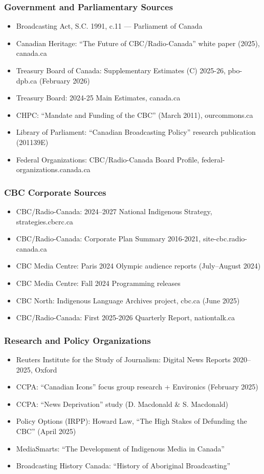 \documentclass[11pt,letterpaper]{article}
\begin{document}
\subsubsection{Government and Parliamentary Sources}
\begin{itemize}[noitemsep]
\item Broadcasting Act, S.C. 1991, c.11 --- Parliament of Canada
\item Canadian Heritage: ``The Future of CBC/Radio-Canada'' white paper (2025), canada.ca
\item Treasury Board of Canada: Supplementary Estimates (C) 2025-26, pbo-dpb.ca (February 2026)
\item Treasury Board: 2024-25 Main Estimates, canada.ca
\item CHPC: ``Mandate and Funding of the CBC'' (March 2011), ourcommons.ca
\item Library of Parliament: ``Canadian Broadcasting Policy'' research publication (201139E)
\item Federal Organizations: CBC/Radio-Canada Board Profile, federal-organizations.canada.ca
\end{itemize}

\subsubsection{CBC Corporate Sources}
\begin{itemize}[noitemsep]
\item CBC/Radio-Canada: 2024--2027 National Indigenous Strategy, strategies.cbcrc.ca
\item CBC/Radio-Canada: Corporate Plan Summary 2016-2021, site-cbc.radio-canada.ca
\item CBC Media Centre: Paris 2024 Olympic audience reports (July--August 2024)
\item CBC Media Centre: Fall 2024 Programming releases
\item CBC North: Indigenous Language Archives project, cbc.ca (June 2025)
\item CBC/Radio-Canada: First 2025-2026 Quarterly Report, nationtalk.ca
\end{itemize}

\subsubsection{Research and Policy Organizations}
\begin{itemize}[noitemsep]
\item Reuters Institute for the Study of Journalism: Digital News Reports 2020--2025, Oxford
\item CCPA: ``Canadian Icons'' focus group research + Environics (February 2025)
\item CCPA: ``News Deprivation'' study (D. Macdonald \& S. Macdonald)
\item Policy Options (IRPP): Howard Law, ``The High Stakes of Defunding the CBC'' (April 2025)
\item MediaSmarts: ``The Development of Indigenous Media in Canada''
\item Broadcasting History Canada: ``History of Aboriginal Broadcasting''
\end{itemize}
\end{document}
